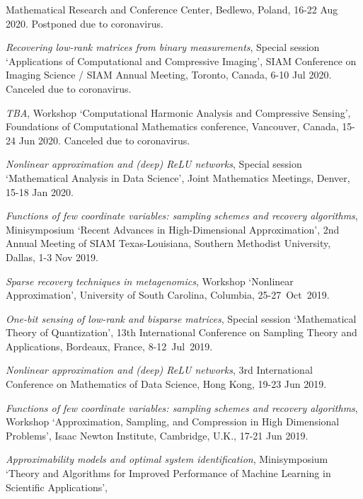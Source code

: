\documentclass[11pt]{article}
\begin{document}
Mathematical Research and Conference Center, Bedlewo, Poland,
16-22 Aug 2020.
{\small Postponed due to coronavirus.}
\item {\sl Recovering low-rank matrices from binary measurements}, 
Special session
`Applications of Computational and Compressive Imaging',
SIAM Conference on Imaging Science / SIAM Annual Meeting,
Toronto, Canada, 6-10 Jul 2020.
{\small Canceled due to coronavirus.}
\item {\sl TBA},
Workshop `Computational Harmonic Analysis and Compressive Sensing',
Foundations of Computational Mathematics conference, 
Vancouver, Canada, 15-24 Jun 2020. {\small Canceled due to coronavirus.}
\item {\sl Nonlinear approximation and (deep) ReLU networks},
Special session `Mathematical Analysis in Data Science',
Joint Mathematics Meetings,
Denver, 15-18 Jan 2020.
\item {\sl Functions of few coordinate variables: sampling schemes and recovery algorithms},
Minisymposium  `Recent Advances in High-Dimensional Approximation',
2nd Annual Meeting of SIAM Texas-Louisiana,
Southern Methodist University, Dallas,
1-3 Nov 2019.
\item {\sl Sparse recovery techniques in metagenomics}, Workshop `Nonlinear Approximation',
University of South Carolina, Columbia, 25-27~Oct~2019.
\item {\sl One-bit sensing of low-rank and bisparse matrices}, 
Special session `Mathematical Theory of Quantization',
13th International Conference on Sampling Theory and Applications, 
Bordeaux, France,  \mbox{8-12~Jul~2019}.
\item {\sl Nonlinear approximation and (deep) ReLU networks},
3rd International Conference on Mathematics of Data Science,
Hong Kong, 19-23 Jun 2019.
\item {\sl Functions of few coordinate variables: sampling schemes and recovery algorithms},
 Workshop  `Approximation, Sampling, and Compression in High Dimensional Problems',
Isaac Newton Institute, Cambridge, U.K., 17-21 Jun 2019. 
\item {\sl Approximability models and optimal system identification}, Minisymposium `Theory and Algorithms for Improved Performance of Machine Learning in Scientific Applications',
\end{document}
